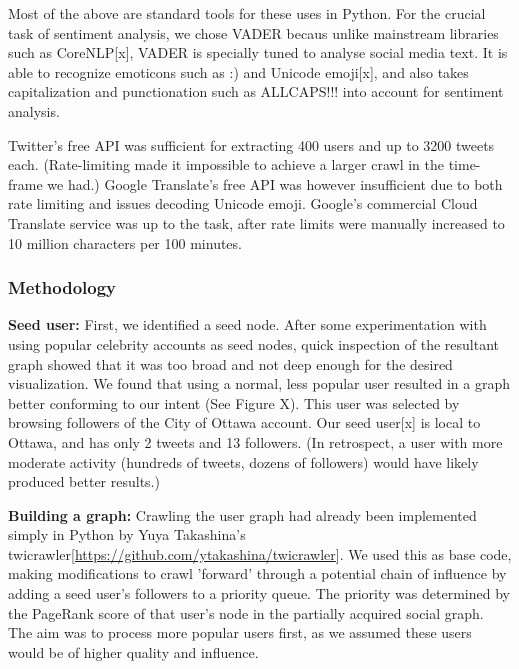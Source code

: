 \documentclass[11pt]{article}
\begin{document}
Most of the above are standard tools for these uses in Python. For the crucial task of sentiment analysis, we chose VADER becaus unlike mainstream libraries such as CoreNLP[x], VADER is specially tuned to analyse social media text. It is able to recognize emoticons such as :) and Unicode emoji[x], and also takes capitalization and punctionation such as ALLCAPS!!! into account for sentiment analysis.\newline

Twitter's free API was sufficient for extracting 400 users and up to 3200 tweets each. (Rate-limiting made it impossible to achieve a larger crawl in the time-frame we had.) Google Translate's free API was however insufficient due to both rate limiting and issues decoding Unicode emoji. Google's commercial Cloud Translate service was up to the task, after rate limits were manually increased to 10 million characters per 100 minutes.\newline

\subsubsection{Methodology}

\textbf{Seed user:} First, we identified a seed node. After some experimentation with using popular celebrity accounts as seed nodes, quick inspection of the resultant graph showed that it was too broad and not deep enough for the desired visualization. We found that using a normal, less popular user resulted in a graph better conforming to our intent (See Figure X). This user was selected by browsing followers of the City of Ottawa account. Our seed user[x] is local to Ottawa, and has only 2 tweets and 13 followers. (In retrospect, a user with more moderate activity (hundreds of tweets, dozens of followers) would have likely produced better results.)\newline

\textbf{Building a graph:} Crawling the user graph had already been implemented simply in Python by Yuya Takashina's twicrawler[\url{https://github.com/ytakashina/twicrawler}]. We used this as base code, making modifications to crawl 'forward' through a potential chain of influence by adding a seed user's followers to a priority queue. The priority was determined by the PageRank score of that user's node in the partially acquired social graph. The aim was to process more popular users first, as we assumed these users would be of higher quality and influence.
\end{document}
